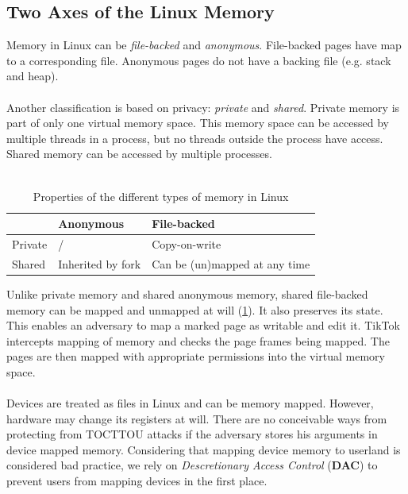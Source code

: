 \subsection{Two Axes of the Linux Memory}

Memory in Linux can be \emph{file-backed} and \emph{anonymous}. File-backed 
pages have map to a corresponding file. Anonymous pages do not have a backing 
file (e.g. stack and heap).
\\
\\
Another classification is based on privacy: \emph{private} and \emph{shared}. 
Private memory is part of only one virtual memory space. This memory space can 
be accessed by multiple threads in a process, but no threads outside the process
have access. Shared memory can be accessed by multiple processes.
\\
\\
\begin{table}[]
  \begin{tabular}{|l|l|l|}
  \hline
          & Anonymous         & File-backed                           \\ \hline
  Private & /                 & Copy-on-write                         \\ \hline
  Shared  & Inherited by fork & Can be (un)mapped at any time         \\ \hline
  \end{tabular}
  \caption{Properties of the different types of memory in Linux}
  \label{tab:memory}
\end{table}

Unlike private memory and shared anonymous memory, shared file-backed memory can
be mapped and unmapped at will (\cref{tab:memory}). It also preserves its state.
This enables an adversary to map a marked page as writable and edit it. TikTok 
intercepts mapping of memory and checks the page frames being mapped. The pages 
are then mapped with appropriate permissions into the virtual memory space.
\\
\\
Devices are treated as files in Linux and can be memory mapped. However, 
hardware may change its registers at will. There are no conceivable ways from 
protecting from TOCTTOU attacks if the adversary stores his arguments in device
mapped memory. Considering that mapping device memory to userland is considered
bad practice, we rely on \emph{Descretionary Access Control} (\textbf{DAC}) to 
prevent users from mapping devices in the first place.

